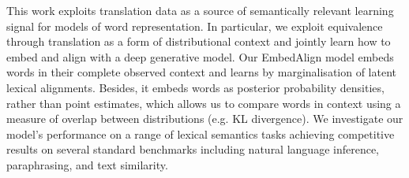 This work exploits translation data as a source of semantically relevant learning signal for models of word representation. In particular, we exploit equivalence through translation as a form of distributional context and jointly learn how to embed and align with a deep generative model. Our EmbedAlign model embeds words in their complete observed context and learns by marginalisation of latent lexical alignments. Besides, it embeds words as posterior probability densities, rather than point estimates, which allows us to compare words in context using a measure of overlap between distributions (e.g. KL divergence). We investigate our model's performance on a range of lexical semantics tasks achieving competitive results on several standard benchmarks including natural language inference, paraphrasing, and text similarity.
